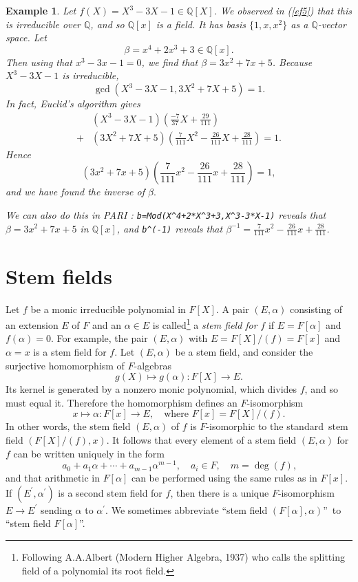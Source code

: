 \documentclass[a4paper,11pt,final,openany]{memoir}
\newtheorem{example}[X]{Example}
\theoremstyle{nonumberplain}
\begin{document}
\begin{example}
\label{ef12}Let $f(X)=X^{3}-3X-1\in\mathbb{Q}[X]$. We observed in (\ref{ef5})
that this is irreducible over $\mathbb{Q}$, and so $\mathbb{Q}{}[x]$ is a
field. It has basis $\{1,x,x^{2}\}$ as a $\mathbb{Q}$-vector space. Let
\[
\beta=x^{4}+2x^{3}+3\in\mathbb{Q}[x].
\]
Then using that $x^{3}-3x-1=0$, we find that $\beta=3x^{2}+7x+5$. Because
$X^{3}-3X-1$ is irreducible,
\[
\gcd(X^{3}-3X-1,3X^{2}+7X+5)=1.
\]
In fact, Euclid's algorithm gives
\begin{align*}
&\textstyle(X^{3}-3X-1)\left(  \frac{-7}{37}X+\frac{29}{111}\right)\\
+&(3X^{2}+7X+5)\left(  \frac{7}{111}X^{2}-\frac{26}{111}X+\frac{28}%
{111}\right)  =1.
\end{align*}
Hence
\[
\textstyle(3x^{2}+7x+5)\left(  \frac{7}{111}x^{2}-\frac{26}{111}x+\frac
{28}{111}\right)  =1,
\]
and we have found the inverse of $\beta.$

We can also do this in PARI%
%
: \verb|b=Mod(X^4+2*X^3+3,X^3-3*X-1)| reveals that $\beta=3x^{2}+7x+5$ in
$\mathbb{Q}[x]$, and \verb|b^(-1)| reveals that $\beta^{-1}=\frac{7}{111}%
x^{2}-\frac{26}{111}x+\frac{28}{111}$.
\end{example}

\section{Stem fields}

\label{sf}

Let $f$ be a monic irreducible polynomial in $F[X]$. A pair $(E,\alpha)$
consisting of an extension $E$ of $F$ and an $\alpha\in E$ is
called\footnote{Following A.A.\thinspace Albert (Modern Higher Algebra, 1937)
who calls the splitting field of a polynomial its root field.} a%
\emph{stem field for} $f$ if $E=F[\alpha]$ and $f(\alpha)=0$. For example, the
pair $(E,\alpha)$ with $E=F[X]/(f)=F[x]$ and $\alpha=x$ is a stem field for
$f$. Let $(E,\alpha)$ be a stem field, and consider the surjective
homomorphism of $F$-algebras%
\[
g(X)\mapsto g(\alpha)\colon F[X]\rightarrow E\text{.}%
\]
Its kernel is generated by a nonzero monic polynomial, which divides $f$, and
so must equal it. Therefore the homomorphism defines an $F$-isomorphism%
\[
x\mapsto\alpha\colon F[x]\rightarrow E,\quad\text{where }F[x]=F[X]/(f)\text{.}%
\]
In other words, the stem field $(E,\alpha)$ of $f$ is $F$-isomorphic to the
standard\ stem field $(F[X]/(f),x)$. It follows that every element of a stem
field $(E,\alpha)$ for $f$ can be written uniquely in the form%
\[
a_{0}+a_{1}\alpha+\cdots+a_{m-1}\alpha^{m-1},\quad a_{i}\in F,\quad
m=\deg(f)\text{,}%
\]
and that arithmetic in $F[\alpha]$ can be performed using the same rules as in
$F[x]$. If $(E^{\prime},\alpha^{\prime})$ is a second stem field for $f$, then
there is a unique $F$-isomorphism $E\rightarrow E^{\prime}$ sending $\alpha$
to $\alpha^{\prime}$. We sometimes abbreviate \textquotedblleft stem field
$(F[\alpha],\alpha)$\textquotedblright\ to \textquotedblleft stem field
$F[\alpha]$\textquotedblright.
\end{document}
